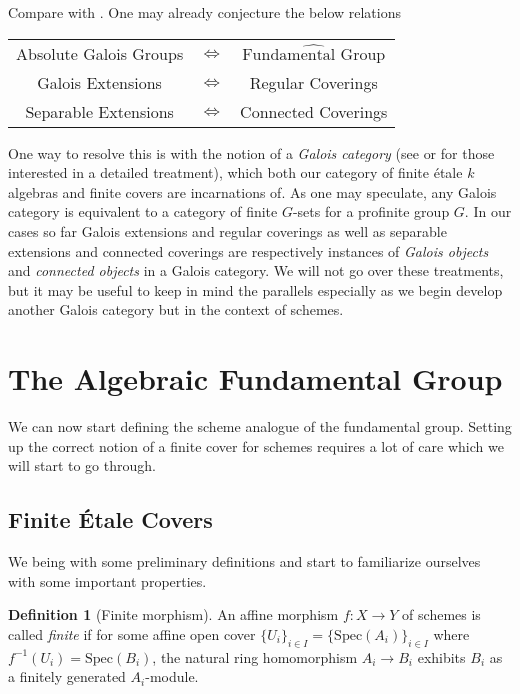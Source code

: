 \documentclass{article}
\theoremstyle{definition}
\newtheorem{definition}[theorem]{Definition}
\theoremstyle{remark}
\theoremstyle{plain}
\begin{document}
Compare with .
One may already conjecture the below relations
\begin{center}
\begin{tabular}{ |c c c| } 
\hline
	Absolute Galois Groups & $\Longleftrightarrow$ & $\widehat{\text{Fundamental Group}}$ \\
 
	Galois Extensions & $\Longleftrightarrow$ & Regular Coverings\\
 
	Separable Extensions & $\Longleftrightarrow$ & Connected Coverings\\
 \hline
\end{tabular}
\end{center}

One way to resolve this is with the notion of a \textit{Galois category} (see \cite{grothendieck} or \cite{Lenstra} for those interested in a detailed treatment), which both our category of finite \'etale $k$ algebras and finite covers are incarnations of. 
As one may speculate, any Galois category is equivalent to a category of finite $G$-sets for a profinite group $G$.
In our cases so far Galois extensions and regular coverings as well as separable extensions and connected coverings are respectively instances of \textit{Galois objects} and \textit{connected objects} in a Galois category.
We will not go over these treatments, but it may be useful to keep in mind the parallels especially as we begin develop another Galois category but in the context of schemes.



\section{The Algebraic Fundamental Group}

We can now start defining the scheme analogue of the fundamental group.
Setting up the correct notion of a finite cover for schemes requires a lot of care which we will start to go through.

\subsection{Finite \'Etale Covers}

We being with some preliminary definitions and start to familiarize ourselves with some important properties.

\begin{definition}[Finite morphism]
	An affine morphism $f: X \to Y$ of schemes is called \textit{finite} if for some affine open cover $\{U_i\}_{i \in I}  = \{\text{Spec}(A_i)\}_{i \in I}$ where $f^{-1}(U_i) = \text{Spec}(B_i)$, the natural ring homomorphism $A_i \to B_i$ exhibits $B_i$ as a finitely generated $A_i$-module.
\end{definition}
\end{document}
